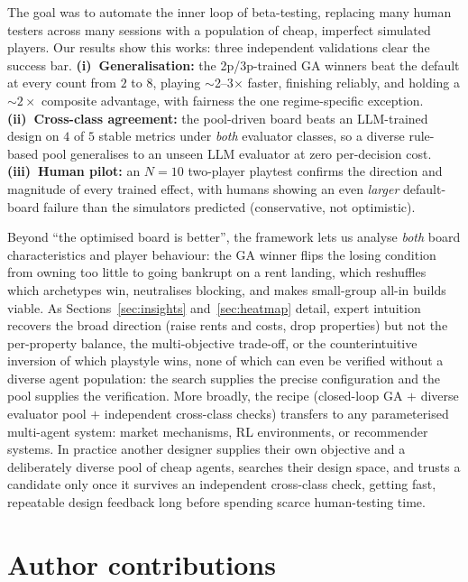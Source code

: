 \documentclass[10pt]{article}
\begin{document}
The goal was to automate the inner loop of beta-testing, replacing
many human testers across many sessions with a population of cheap,
imperfect simulated players. Our results show this works: three
independent validations clear the success bar.
\textbf{(i)~Generalisation:} the 2p/3p-trained GA winners beat the
default at every count from $2$ to $8$, playing $\sim$2--3$\times$
faster, finishing reliably, and holding a $\sim$$2\times$ composite
advantage, with fairness the one regime-specific exception. \textbf{(ii)~Cross-class agreement:}
the pool-driven board beats an LLM-trained design on $4$ of $5$ stable
metrics under \emph{both} evaluator classes, so a diverse rule-based
pool generalises to an unseen LLM evaluator at zero per-decision cost.
\textbf{(iii)~Human pilot:} an $N{=}10$ two-player playtest confirms
the direction and magnitude of every trained effect, with humans
showing an even \emph{larger} default-board failure than the
simulators predicted (conservative, not optimistic).

Beyond ``the optimised board is better'', the framework lets us analyse
\emph{both} board characteristics and player behaviour: the GA winner
flips the losing condition from owning too little to going bankrupt on
a rent landing, which reshuffles which archetypes win, neutralises
blocking, and makes small-group all-in builds viable. As
Sections~\ref{sec:insights} and~\ref{sec:heatmap} detail, expert
intuition recovers the broad direction (raise rents and costs, drop
properties) but not the per-property balance, the multi-objective
trade-off, or the counterintuitive inversion of which playstyle wins,
none of which can even be verified without a diverse agent population:
the search supplies the precise configuration and the pool supplies the
verification. More broadly, the
recipe (closed-loop GA $+$ diverse evaluator pool $+$ independent
cross-class checks) transfers to any parameterised multi-agent system:
market mechanisms, RL environments, or recommender systems. In
practice another designer supplies their own objective and a
deliberately diverse pool of cheap agents, searches their design space,
and trusts a candidate only once it survives an independent
cross-class check, getting fast, repeatable design feedback long before
spending scarce human-testing time.

\section{Author contributions}\label{sec:team}
\end{document}
